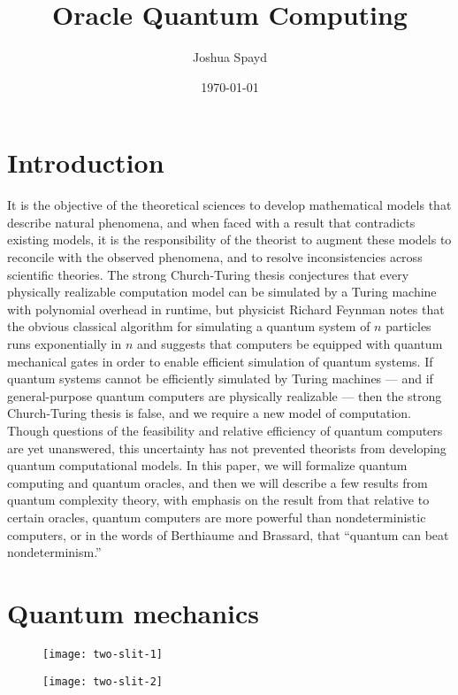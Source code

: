 \documentclass[12pt]{article}
\title{Oracle Quantum Computing}
\author{Joshua Spayd}
\date{\today}
\begin{document}
\maketitle

\section{Introduction}
It is the objective of the theoretical sciences to develop mathematical models
that describe natural phenomena, and when faced with a result that contradicts
existing models, it is the responsibility of the theorist to augment these
models to reconcile with the observed phenomena, and to resolve
inconsistencies across scientific theories. The strong Church-Turing thesis
conjectures that every physically realizable computation model can be
simulated by a Turing machine with polynomial overhead in runtime, but
physicist Richard Feynman \cite{Fey82} notes that the obvious classical
algorithm for simulating a quantum system of $n$ particles runs exponentially
in $n$ and suggests that computers be equipped with quantum mechanical gates
in order to enable efficient simulation of quantum systems. If quantum systems
cannot be efficiently simulated by Turing machines --- and if general-purpose
quantum computers are physically realizable --- then the strong Church-Turing
thesis is false, and we require a new model of computation. Though questions
of the feasibility and relative efficiency of quantum computers are yet
unanswered, this uncertainty has not prevented theorists from developing
quantum computational models. In this paper, we will formalize quantum computing
and quantum oracles, and then we will describe a few results from quantum
complexity theory, with emphasis on the result from \cite{BB92} that relative to
certain oracles, quantum computers are more powerful than nondeterministic
computers, or in the words of  Berthiaume and Brassard, that ``quantum can beat
nondeterminism.''


\section{Quantum mechanics}
\begin{figure}[H]
  \texttt{[image: two-slit-1]}
  \caption{\cite[p. 203]{AB09}}
  \label{fig:two-slit-1}
\end{figure}
\begin{figure}[H]
  \texttt{[image: two-slit-2]}
  \caption{\cite[p. 203]{AB09}}
  \label{fig:two-slit-2}
\end{figure}
\end{document}
